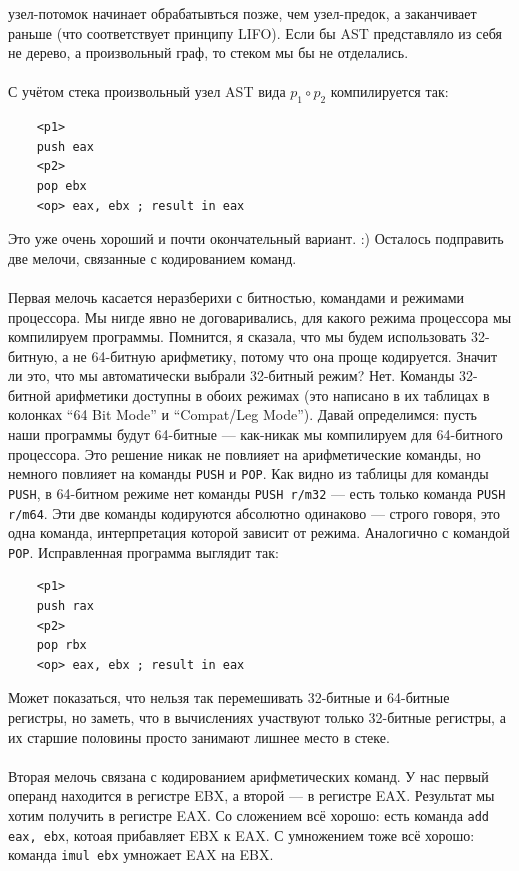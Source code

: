 \documentclass[11pt]{book}
\begin{document}
узел-потомок начинает обрабатывться позже, чем узел-предок, а заканчивает раньше
(что соответствует принципу LIFO).
Если бы AST представляло из себя не дерево, а произвольный граф, то стеком мы бы не отделались.
\\ \\
С учётом стека произвольный узел AST вида $p_1 \circ p_2$ компилируется так:
\begin{verbatim}
    <p1>
    push eax
    <p2>
    pop ebx
    <op> eax, ebx ; result in eax
\end{verbatim}
Это уже очень хороший и почти окончательный вариант. :)
Осталось подправить две мелочи, связанные с кодированием команд.
\\ \\
Первая мелочь касается неразберихи с битностью, командами и режимами процессора.
Мы нигде явно не договаривались, для какого режима процессора мы компилируем программы.
Помнится, я сказала, что мы будем использовать 32-битную, а не 64-битную арифметику, потому что она проще кодируется.
Значит ли это, что мы автоматически выбрали 32-битный режим?
Нет.
Команды 32-битной арифметики доступны в обоих режимах (это написано в их таблицах в колонках ``64 Bit Mode'' и ``Compat/Leg Mode'').
Давай определимся: пусть наши программы будут 64-битные --- как-никак мы компилируем для 64-битного процессора.
Это решение никак не повлияет на арифметические команды, но немного повлияет на команды \texttt{PUSH} и \texttt{POP}.
Как видно из таблицы для команды \texttt{PUSH}, в 64-битном режиме нет команды \texttt{PUSH r/m32} --- есть только команда \texttt{PUSH r/m64}.
Эти две команды кодируются абсолютно одинаково --- строго говоря, это одна команда, интерпретация которой зависит от режима.
Аналогично с командой \texttt{POP}.
Исправленная программа выглядит так:
\begin{verbatim}
    <p1>
    push rax
    <p2>
    pop rbx
    <op> eax, ebx ; result in eax
\end{verbatim}
Может показаться, что нельзя так перемешивать 32-битные и 64-битные регистры,
но заметь, что в вычислениях участвуют только 32-битные регистры, а их старшие половины просто занимают лишнее место в стеке.
\\ \\
Вторая мелочь связана с кодированием арифметических команд.
У нас первый операнд находится в регистре EBX, а второй --- в регистре EAX.
Результат мы хотим получить в регистре EAX.
Со сложением всё хорошо: есть команда \texttt{add eax, ebx}, котоая прибавляет EBX к EAX.
С умножением тоже всё хорошо: команда \texttt{imul ebx} умножает EAX на EBX.
\end{document}
